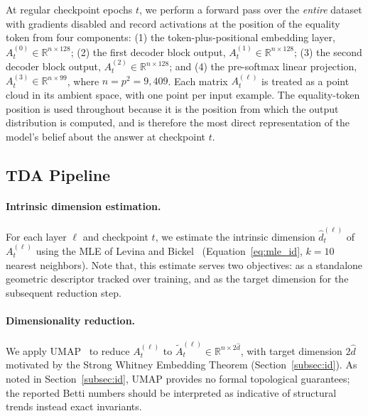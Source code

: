 At regular checkpoint epochs $t$, we perform a forward pass over the
\emph{entire} dataset with gradients disabled and record activations
at the position of the equality token from four components:
(1) the token-plus-positional embedding layer,
$A^{(0)}_t \in \mathbb{R}^{n \times 128}$;
(2) the first decoder block output,
$A^{(1)}_t \in \mathbb{R}^{n \times 128}$;
(3) the second decoder block output,
$A^{(2)}_t \in \mathbb{R}^{n \times 128}$; and
(4) the pre-softmax linear projection,
$A^{(3)}_t \in \mathbb{R}^{n \times 99}$,
where $n = p^2 = 9{,}409$. Each matrix $A^{(\ell)}_t$ is treated as a
point cloud in its ambient space, with one point per input example.
The equality-token position is used throughout because it is the
position from which the output distribution is computed, and is
therefore the most direct representation of the model's belief about
the answer at checkpoint $t$.

\subsection{TDA Pipeline}
\label{subsec:tda_pipeline}

\paragraph{Intrinsic dimension estimation.}
For each layer $\ell$ and checkpoint $t$, we estimate the intrinsic
dimension $\hat{d}^{(\ell)}_t$ of $A^{(\ell)}_t$ using the MLE of
Levina and Bickel~\cite{LevinaBickel} (Equation~\ref{eq:mle_id},
$k = 10$ nearest neighbors). Note that, this estimate serves two objectives: as a
standalone geometric descriptor tracked over training, and as the target dimension for the
subsequent reduction step.

\paragraph{Dimensionality reduction.}
We apply UMAP~\cite{McInnes2018} to reduce $A^{(\ell)}_t$ to $\tilde{A}^{(\ell)}_t \in \mathbb{R}^{n \times 2\hat{d}}$, with target dimension $2\hat{d}$ motivated by the Strong Whitney Embedding Theorem (Section~\ref{subsec:id}). As noted in Section~\ref{subsec:id}, UMAP provides no formal topological guarantees; the reported Betti numbers should be interpreted as indicative of structural trends instead exact invariants.


